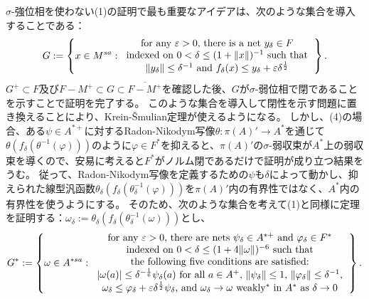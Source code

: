 \documentclass[noamsfonts,a4paper,10pt]{amsart}
\theoremstyle{plain}
\theoremstyle{definition}
\theoremstyle{remark}
\begin{document}
$\sigma$-強位相を使わない(1)の証明で最も重要なアイデアは、次のような集合を導入することである：
\[G:=\left\{x\in M^{sa}:\begin{tabular}{c}
for any $\varepsilon>0$, there is a net $y_\delta\in F$\\
indexed on $0<\delta\le(1+\|x\|)^{-1}$ such that\\
$\|y_\delta\|\le\delta^{-1}$ and $f_\delta(x)\le y_\delta+\varepsilon\delta^{\frac12}$
\end{tabular}\right\}.\]
$G^+\subset F$及び$F-M^+\subset G\subset\overline{F-M^+}$を確認した後、$G$が$\sigma$-弱位相で閉であることを示すことで証明を完了する。
このような集合を導入して閉性を示す問題に置き換えることにより、Krein-\v Smulian定理が使えるようになる。
しかし、(4)の場合、ある$\psi\in A^{*+}$に対するRadon-Nikodym写像$\theta:\pi(A)'\to A^*$を通じて$\theta(f_\delta(\theta^{-1}(\varphi)))$のように$\varphi\in F^*$を抑えると、$\pi(A)'$の$\sigma$-弱収束が$A^*$上の弱収束を導くので、安易に考えると$F^*$がノルム閉であるだけで証明が成り立つ結果をうむ。
従って、Radon-Nikodym写像を定義するための$\psi$も$\delta$によって動かし、抑えられた線型汎函数$\theta_\delta(f_\delta(\theta_\delta^{-1}(\varphi)))$を$\pi(A)'$内の有界性ではなく、$A^*$内の有界性を使うようにする。
そのため、次のような集合を考えて(1)と同様に定理を証明する：$\omega_\delta:=\theta_\delta(f_\delta(\theta_{\delta}^{-1}(\omega)))$とし、
\[G^*:=\left\{\omega\in A^{*sa}:\begin{tabular}{c}
for any $\varepsilon>0$, there are nets $\psi_\delta\in A^{*+}$ and $\varphi_\delta\in F^*$\\
indexed on $0<\delta\le(1+4\|\omega\|)^{-6}$ such that\\
the following five conditions are satisfied:\\
 $|\omega(a)|\le\delta^{-\frac16}\psi_\delta(a)$ for all $a\in A^+$, $\|\psi_\delta\|\le1$, $\|\varphi_\delta\|\le\delta^{-1}$,\\
$\omega_\delta\le\varphi_\delta+\varepsilon\delta^{\frac12}\psi_\delta$, and $\omega_\delta\to\omega$ weakly$^*$ in $A^*$ as $\delta\to0$
\end{tabular}\right\}.\]

\thispagestyle{empty}
\end{document}
